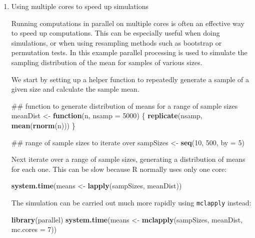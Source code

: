 \documentclass[]{book}
\newenvironment{Shaded}{\begin{snugshade}}{\end{snugshade}}
\newcommand{\KeywordTok}[1]{\textcolor[rgb]{0.13,0.29,0.53}{\textbf{#1}}}
\newcommand{\DataTypeTok}[1]{\textcolor[rgb]{0.13,0.29,0.53}{#1}}
\newcommand{\DecValTok}[1]{\textcolor[rgb]{0.00,0.00,0.81}{#1}}
\newcommand{\StringTok}[1]{\textcolor[rgb]{0.31,0.60,0.02}{#1}}
\newcommand{\ControlFlowTok}[1]{\textcolor[rgb]{0.13,0.29,0.53}{\textbf{#1}}}
\newcommand{\NormalTok}[1]{#1}
\begin{document}
\begin{enumerate}
\def\labelenumi{\arabic{enumi}.}
\item
  Using multiple cores to speed up simulations

  Running computations in parallel on multiple cores is often an
  effective way to speed up computations. This can be especially useful
  when doing simulations, or when using resampling methods such as
  bootstrap or permutation tests. In this example parallel processing is
  used to simulate the sampling distribution of the mean for samples of
  various sizes.

  We start by setting up a helper function to repeatedly generate a
  sample of a given size and calculate the sample mean.

\begin{Shaded}
\begin{Highlighting}[]
\NormalTok{## function to generate distribution of means for a range of sample sizes}
\NormalTok{meanDist <-}\StringTok{ }\ControlFlowTok{function}\NormalTok{(n, }\DataTypeTok{nsamp =} \DecValTok{5000}\NormalTok{) \{}
  \KeywordTok{replicate}\NormalTok{(nsamp, }\KeywordTok{mean}\NormalTok{(}\KeywordTok{rnorm}\NormalTok{(n)))}
\NormalTok{\}}

\NormalTok{## range of sample sizes to iterate over}
\NormalTok{sampSizes <-}\StringTok{ }\KeywordTok{seq}\NormalTok{(}\DecValTok{10}\NormalTok{, }\DecValTok{500}\NormalTok{, }\DataTypeTok{by =} \DecValTok{5}\NormalTok{)}
\end{Highlighting}
\end{Shaded}

  Next iterate over a range of sample sizes, generating a distribution
  of means for each one. This can be slow because R normally uses only
  one core:

\begin{Shaded}
\begin{Highlighting}[]
\KeywordTok{system.time}\NormalTok{(means <-}\StringTok{ }\KeywordTok{lapply}\NormalTok{(sampSizes, meanDist))}
\end{Highlighting}
\end{Shaded}

  The simulation can be carried out much more rapidly using
  \texttt{mclapply} instead:

\begin{Shaded}
\begin{Highlighting}[]
\KeywordTok{library}\NormalTok{(parallel)}
\KeywordTok{system.time}\NormalTok{(means <-}\StringTok{ }\KeywordTok{mclapply}\NormalTok{(sampSizes, meanDist, }\DataTypeTok{mc.cores =} \DecValTok{7}\NormalTok{))}
\end{Highlighting}
\end{Shaded}


\end{enumerate}
\end{document}
